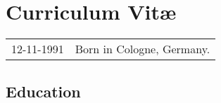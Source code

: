 \chapter*{Curriculum Vit\ae}

\makeatletter
\authors{\@firstname\ {\titleshape\@lastname}}
\makeatother

\noindent
\begin{tabular}{p{}l}
    12-11-1991 & Born in Cologne, Germany.
\end{tabular}

\section*{Education}

